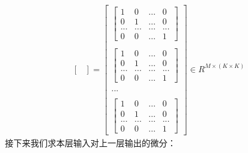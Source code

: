 \documentclass[UTF8]{article}
\begin{document}
\begin{equation}
\begin{aligned}
\begin{bmatrix}
\end{bmatrix}
= \begin{bmatrix}
\begin{bmatrix}
 1 & 0 & ... & 0 \\
 0 & 1 & ... & 0 \\
 ... & ... & ... & ... \\
 0 & 0 & ... & 1
 \end{bmatrix} \\ \\
\begin{bmatrix}
 1 & 0 & ... & 0 \\
 0 & 1 & ... & 0 \\
 ... & ... & ... & ... \\
 0 & 0 & ... & 1
 \end{bmatrix} \\ \\
 ... \\ \\
 \begin{bmatrix}
 1 & 0 & ... & 0 \\
 0 & 1 & ... & 0 \\
 ... & ... & ... & ... \\
 0 & 0 & ... & 1
 \end{bmatrix}
\end{bmatrix} \in R^{M \times (K \times K)}
\end{aligned}
\label{mlp-pZ-pb-def}
\end{equation}
接下来我们求本层输入对上一层输出的微分：
\end{document}
